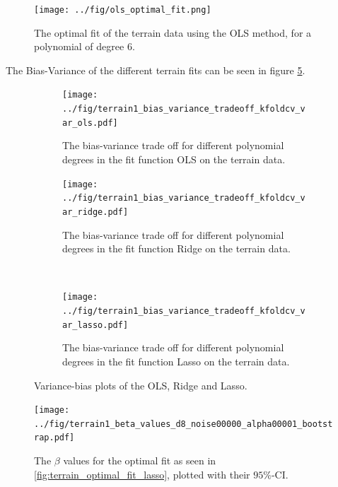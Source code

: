 \documentclass[11pt]{article}
\begin{document}
\begin{figure}[H]
    \centering
    \texttt{[image: ../fig/ols\_optimal\_fit.png]}
    \caption{The optimal fit of the terrain data using the OLS method, for a polynomial of degree 6.}
    \label{fig:terrain_optimal_fit_ols}
\end{figure}


The Bias-Variance of the different terrain fits can be seen in figure \ref{fig:bias-var-terrain}.

\begin{figure}[H]
    \centering
    \begin{subfigure}[b]{0.5\textwidth}
        \centering
        \texttt{[image: ../fig/terrain1\_bias\_variance\_tradeoff\_kfoldcv\_var\_ols.pdf]}
        \caption{The bias-variance trade off for different polynomial degrees in the fit function OLS on the terrain data.}
        \label{fig:terrain-bias-var-ols}
    \end{subfigure}%
    \begin{subfigure}[b]{0.5\textwidth}
        \centering
        \texttt{[image: ../fig/terrain1\_bias\_variance\_tradeoff\_kfoldcv\_var\_ridge.pdf]}
        \caption{The bias-variance trade off for different polynomial degrees in the fit function Ridge on the terrain data.}
        \label{fig:terrain-bias-var-ridge}
    \end{subfigure} \\
    \begin{subfigure}[b]{0.5\textwidth}
        \centering
        \texttt{[image: ../fig/terrain1\_bias\_variance\_tradeoff\_kfoldcv\_var\_lasso.pdf]}
        \caption{The bias-variance trade off for different polynomial degrees in the fit function Lasso on the terrain data.}
        \label{fig:terrain-bias-var-lasso}
    \end{subfigure}
    \caption{Variance-bias plots of the OLS, Ridge and Lasso.}
    \label{fig:bias-var-terrain}
\end{figure}

\begin{figure}[H]
    \centering
    \texttt{[image: ../fig/terrain1\_beta\_values\_d8\_noise00000\_alpha00001\_bootstrap.pdf]}
    \caption{The $\beta$ values for the optimal fit as seen in \ref{fig:terrain_optimal_fit_lasso}, plotted with their $95\%$-CI.}
    \label{fig:terrain_optimal_fit_params}
\end{figure}


\end{document}
